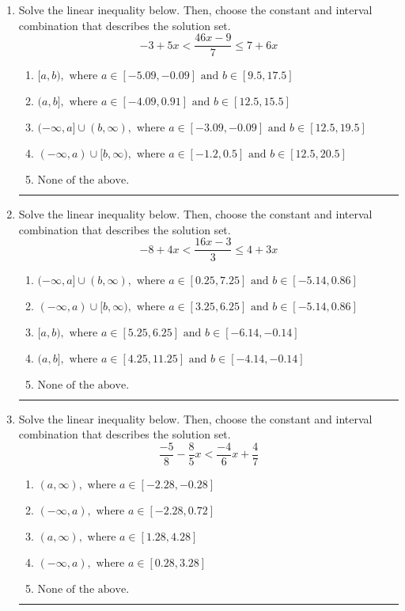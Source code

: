 \documentclass[14pt]{extbook}
\newcommand{\litem}[1]{\item#1\hspace*{-1cm}\rule{\textwidth}{0.4pt}}
\begin{document}
\begin{enumerate}
{\begin{enumerate}[label=\Alph*.]
\end{enumerate} }
\litem{
Solve the linear inequality below. Then, choose the constant and interval combination that describes the solution set.\[ -3 + 5 x < \frac{46 x - 9}{7} \leq 7 + 6 x \]\begin{enumerate}[label=\Alph*.]
\item \( [a, b), \text{ where } a \in [-5.09, -0.09] \text{ and } b \in [9.5, 17.5] \)
\item \( (a, b], \text{ where } a \in [-4.09, 0.91] \text{ and } b \in [12.5, 15.5] \)
\item \( (-\infty, a] \cup (b, \infty), \text{ where } a \in [-3.09, -0.09] \text{ and } b \in [12.5, 19.5] \)
\item \( (-\infty, a) \cup [b, \infty), \text{ where } a \in [-1.2, 0.5] \text{ and } b \in [12.5, 20.5] \)
\item \( \text{None of the above.} \)

\end{enumerate} }
\litem{
Solve the linear inequality below. Then, choose the constant and interval combination that describes the solution set.\[ -8 + 4 x < \frac{16 x - 3}{3} \leq 4 + 3 x \]\begin{enumerate}[label=\Alph*.]
\item \( (-\infty, a] \cup (b, \infty), \text{ where } a \in [0.25, 7.25] \text{ and } b \in [-5.14, 0.86] \)
\item \( (-\infty, a) \cup [b, \infty), \text{ where } a \in [3.25, 6.25] \text{ and } b \in [-5.14, 0.86] \)
\item \( [a, b), \text{ where } a \in [5.25, 6.25] \text{ and } b \in [-6.14, -0.14] \)
\item \( (a, b], \text{ where } a \in [4.25, 11.25] \text{ and } b \in [-4.14, -0.14] \)
\item \( \text{None of the above.} \)

\end{enumerate} }
\litem{
Solve the linear inequality below. Then, choose the constant and interval combination that describes the solution set.\[ \frac{-5}{8} - \frac{8}{5} x < \frac{-4}{6} x + \frac{4}{7} \]\begin{enumerate}[label=\Alph*.]
\item \( (a, \infty), \text{ where } a \in [-2.28, -0.28] \)
\item \( (-\infty, a), \text{ where } a \in [-2.28, 0.72] \)
\item \( (a, \infty), \text{ where } a \in [1.28, 4.28] \)
\item \( (-\infty, a), \text{ where } a \in [0.28, 3.28] \)
\item \( \text{None of the above}. \)


\end{enumerate}}
\end{enumerate}
\end{document}
